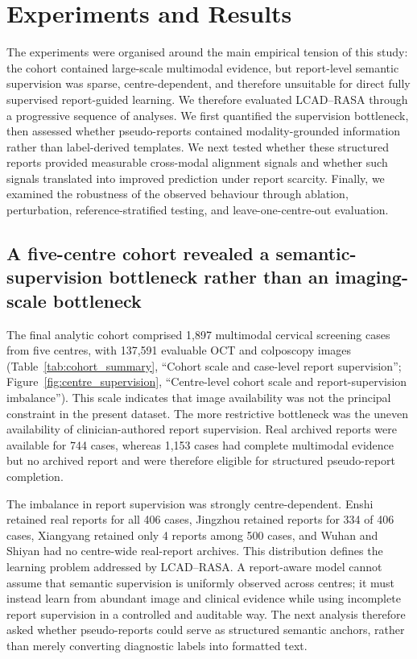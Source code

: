 \section{Experiments and Results}
\label{sec:experiments_results}

The experiments were organised around the main empirical tension of this study: the cohort contained large-scale multimodal evidence, but report-level semantic supervision was sparse, centre-dependent, and therefore unsuitable for direct fully supervised report-guided learning. We therefore evaluated LCAD--RASA through a progressive sequence of analyses. We first quantified the supervision bottleneck, then assessed whether pseudo-reports contained modality-grounded information rather than label-derived templates. We next tested whether these structured reports provided measurable cross-modal alignment signals and whether such signals translated into improved prediction under report scarcity. Finally, we examined the robustness of the observed behaviour through ablation, perturbation, reference-stratified testing, and leave-one-centre-out evaluation.

\subsection{A five-centre cohort revealed a semantic-supervision bottleneck rather than an imaging-scale bottleneck}
\label{subsec:cohort_results}

The final analytic cohort comprised 1,897 multimodal cervical screening cases from five centres, with 137,591 evaluable OCT and colposcopy images (Table~\ref{tab:cohort_summary}, ``Cohort scale and case-level report supervision''; Figure~\ref{fig:centre_supervision}, ``Centre-level cohort scale and report-supervision imbalance''). This scale indicates that image availability was not the principal constraint in the present dataset. The more restrictive bottleneck was the uneven availability of clinician-authored report supervision. Real archived reports were available for 744 cases, whereas 1,153 cases had complete multimodal evidence but no archived report and were therefore eligible for structured pseudo-report completion.

The imbalance in report supervision was strongly centre-dependent. Enshi retained real reports for all 406 cases, Jingzhou retained reports for 334 of 406 cases, Xiangyang retained only 4 reports among 500 cases, and Wuhan and Shiyan had no centre-wide real-report archives. This distribution defines the learning problem addressed by LCAD--RASA. A report-aware model cannot assume that semantic supervision is uniformly observed across centres; it must instead learn from abundant image and clinical evidence while using incomplete report supervision in a controlled and auditable way. The next analysis therefore asked whether pseudo-reports could serve as structured semantic anchors, rather than merely converting diagnostic labels into formatted text.

